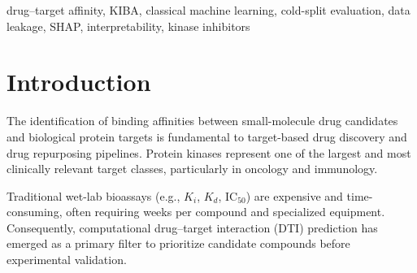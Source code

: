 \documentclass[10pt,conference]{IEEEtran}
\begin{document}
\begin{abstract}
Predicting drug--target binding affinity is a central task in computational drug discovery, yet conventional evaluation protocols relying on random train/test splits often suffer from similarity-based data leakage, yielding artificially optimistic performance metrics that degrade on genuinely unseen molecular entities. In this work, we present \textbf{DTI-ML}, a systematic empirical evaluation of four classical machine learning regressors---Random Forest (RF), XGBoost, Support Vector Regression (SVR), and Gaussian Process Regression (GPR)---for kinase-inhibitor binding affinity prediction using the real KIBA benchmark dataset. We evaluate all models across three distinct partitioning protocols: standard Random Split, Cold-Drug Split (unseen drug candidates), and Cold-Protein Split (unseen kinase targets). Each drug--target pair is featurized into a concatenated 1,227-dimensional vector combining 1,024-bit Morgan fingerprints (ECFP4) and 6 physicochemical descriptors from RDKit with 197 protein features (AAC, CTD, and PseAAC). We apply SHapley Additive exPlanations (SHAP) to provide local interpretability for individual predictions. Across 12 experiment cells (4~models $\times$ 3 splits, seed~42), XGBoost consistently achieves the lowest root-mean-square error, while cold-split evaluation reveals a substantial generalization gap relative to random-split performance.
\end{abstract}

\begin{IEEEkeywords}
drug--target affinity, KIBA, classical machine learning, cold-split evaluation, data leakage, SHAP, interpretability, kinase inhibitors
\end{IEEEkeywords}

\section{Introduction}
\label{sec:intro}

The identification of binding affinities between small-molecule drug candidates and biological protein targets is fundamental to target-based drug discovery and drug repurposing pipelines. Protein kinases represent one of the largest and most clinically relevant target classes, particularly in oncology and immunology.

Traditional wet-lab bioassays (e.g., $K_i$, $K_d$, IC$_{50}$) are expensive and time-consuming, often requiring weeks per compound and specialized equipment. Consequently, computational drug--target interaction (DTI) prediction has emerged as a primary filter to prioritize candidate compounds before experimental validation.
\end{document}
